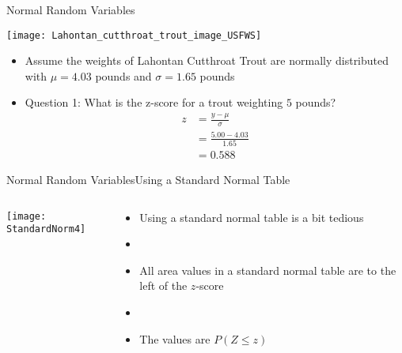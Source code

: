 \documentclass[xcolor=dvipsnames]{beamer}
\begin{document}
\begin{frame}{Normal Random Variables}
	\begin{center}
		\texttt{[image: Lahontan\_cutthroat\_trout\_image\_USFWS]}
	\end{center}
	\begin{itemize}
		\item Assume the weights of Lahontan Cutthroat Trout are normally distributed with $\mu = 4.03$ pounds and $\sigma = 1.65$ pounds \pause
		\item Question 1: What is the z-score for a trout weighting $5$ pounds? \pause
		\begin{align*}
			z &= \frac{y-\mu}{\sigma} \\
			&= \frac{5.00-4.03}{1.65} \\
			&= 0.588
		\end{align*}
	\end{itemize}
\end{frame}

\begin{frame}{Normal Random Variables}{Using a Standard Normal Table}
	\begin{columns}
		\begin{column}{.6 \textwidth}
				\begin{center}
				\texttt{[image: StandardNorm4]}
			\end{center}
		\end{column}
	\begin{column}{.4 \textwidth}
			\begin{itemize}
			\item Using a standard normal table is a bit tedious \pause
			\item[]
			\item All area values in a standard normal table are to the left of the $z$-score \pause
			\item[]
			\item The values are $P(Z\leq z)$
		\end{itemize}
	\end{column}
	\end{columns}
\end{frame}
\end{document}
